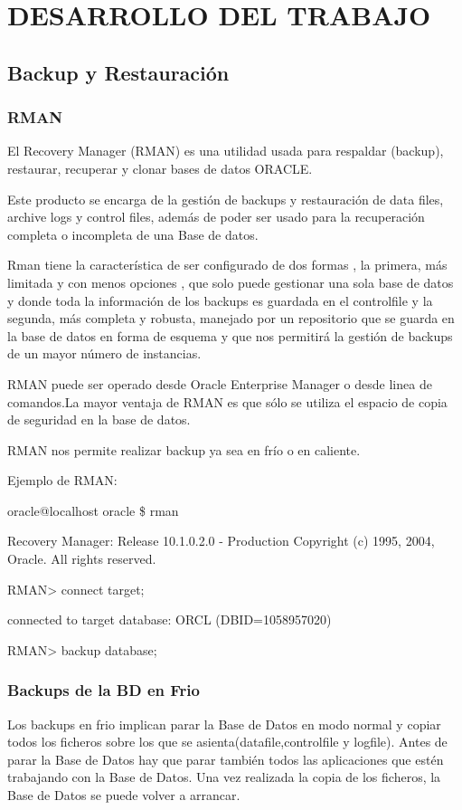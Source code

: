\chapter{DESARROLLO DEL TRABAJO}

\section{Backup y Restauración}
\subsection{RMAN}
El Recovery Manager (RMAN) es una utilidad usada para respaldar (backup), restaurar, recuperar y clonar bases de datos ORACLE.

Este producto se encarga de la gestión de backups y restauración de data files, archive logs y control files, además de poder ser usado para la recuperación completa o incompleta de una Base de datos.

Rman tiene la característica de ser configurado de dos formas , la primera, más limitada y con menos opciones , que solo puede gestionar una sola base de datos y donde toda la información de los backups es guardada en el controlfile y la segunda, más completa y robusta, manejado por un repositorio que se guarda en la base de datos en forma de esquema y que nos permitirá la gestión de backups de un mayor número de instancias.

RMAN puede ser operado desde Oracle Enterprise Manager o desde linea de comandos.La mayor ventaja de RMAN es que sólo se utiliza el espacio de copia de seguridad en la base de datos.

RMAN nos permite realizar backup ya sea en frío o en caliente.

Ejemplo de RMAN:

\begin{list}{}{}
\item [oracle@localhost oracle] \$ rman
\item Recovery Manager: Release 10.1.0.2.0 - Production Copyright (c) 1995, 2004, Oracle. All rights reserved.
\item RMAN> connect target;
\item connected to target database: ORCL (DBID=1058957020)
\item RMAN> backup database;
\end{list}


\subsection{Backups de la BD en Frio}
Los backups en frio implican parar la Base de Datos en modo normal y copiar todos los ficheros sobre los que se asienta(datafile,controlfile y logfile). Antes de parar la Base de Datos hay que parar también todos las aplicaciones que estén trabajando con la Base de Datos. Una vez realizada la copia de los ficheros, la Base de Datos se puede volver a arrancar.

